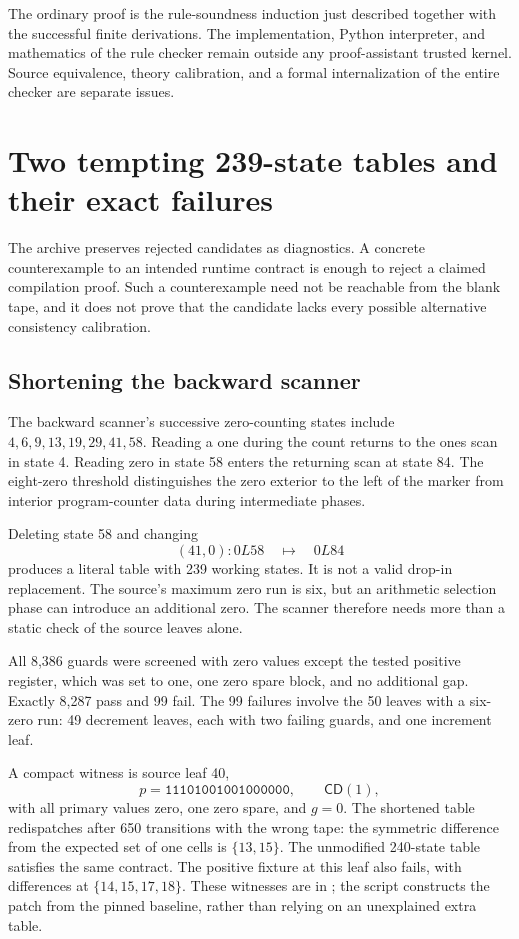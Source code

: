 \documentclass[11pt,a4paper]{article}
\theoremstyle{definition}
\newcommand{\CD}{\mathsf{CD}}
\newcommand{\file}[1]{\texttt{\path{#1}}}
\begin{document}
The ordinary proof is the rule-soundness induction just described together
with the successful finite derivations.  The implementation, Python
interpreter, and mathematics of the rule checker remain outside any
proof-assistant trusted kernel.  Source equivalence, theory calibration,
and a formal internalization of the entire checker are separate issues.

\section{Two tempting 239-state tables and their exact failures}
\label{sec:rejected}

The archive preserves rejected candidates as diagnostics.  A concrete
counterexample to an intended runtime contract is enough to reject a
claimed compilation proof.  Such a counterexample need not be reachable
from the blank tape, and it does not prove that the candidate lacks every
possible alternative consistency calibration.

\subsection{Shortening the backward scanner}

The backward scanner's successive zero-counting states include
$4,6,9,13,19,29,41,58$.  Reading a one during the count returns to the
ones scan in state 4.  Reading zero in state 58 enters the returning scan
at state 84.  The eight-zero threshold distinguishes the zero exterior
to the left of the marker from interior program-counter data during
intermediate phases.

Deleting state 58 and changing
\[
 (41,0):0L58\quad\longmapsto\quad0L84
\]
produces a literal table with 239 working states.  It is not a valid
drop-in replacement.  The source's maximum zero run is six, but an
arithmetic selection phase can introduce an additional zero.  The scanner
therefore needs more than a static check of the source leaves alone.

All 8,386 guards were screened with zero values except the tested positive
register, which was set to one, one zero spare block, and no additional
gap.  Exactly 8,287 pass and 99 fail.  The 99 failures involve the 50 leaves
with a six-zero run: 49 decrement leaves, each with two failing guards,
and one increment leaf.

A compact witness is source leaf 40,
\[
 p=\mathtt{11101001001000000},\qquad\CD(1),
\]
with all primary values zero, one zero spare, and $g=0$.  The shortened
table redispatches after 650 transitions with the wrong tape: the symmetric
difference from the expected set of one cells is $\{13,15\}$.  The
unmodified 240-state table satisfies the same contract.  The positive
fixture at this leaf also fails, with differences at
$\{14,15,17,18\}$.  These witnesses are in
\file{scanner/scanner_probe.json}; the script constructs the patch from
the pinned baseline, rather than relying on an unexplained extra table.
\end{document}
